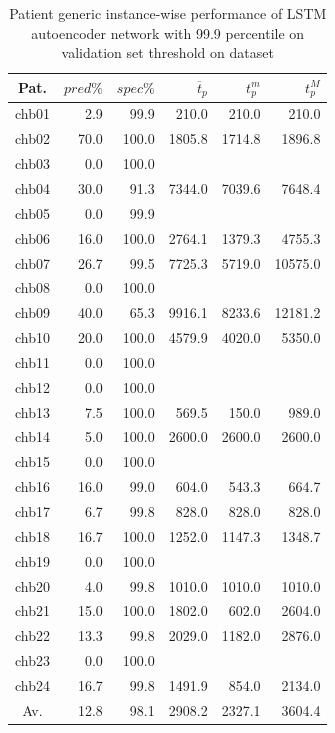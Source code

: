 \begin{table}[ht]
    \centering
    \begin{tabular}{c|rrrrr}
    Pat.  & $pred\%$ & $spec\%$ & $\overline{t}_p$   & $t_p^m$  & $t_p^M$   \\ \hline
    chb01   & 2.9    & 99.9   & 210.0   & 210.0   & 210.0   \\
    chb02   & 70.0   & 100.0  & 1805.8  & 1714.8  & 1896.8  \\
    chb03   & 0.0    & 100.0  &         &         &         \\
    chb04   & 30.0   & 91.3   & 7344.0  & 7039.6  & 7648.4  \\
    chb05   & 0.0    & 99.9   &         &         &         \\
    chb06   & 16.0   & 100.0  & 2764.1  & 1379.3  & 4755.3  \\
    chb07   & 26.7   & 99.5   & 7725.3  & 5719.0  & 10575.0 \\
    chb08   & 0.0    & 100.0  &         &         &         \\
    chb09   & 40.0   & 65.3   & 9916.1  & 8233.6  & 12181.2 \\
    chb10   & 20.0   & 100.0  & 4579.9  & 4020.0  & 5350.0  \\
    chb11   & 0.0    & 100.0  &         &         &         \\
    chb12   & 0.0    & 100.0  &         &         &         \\
    chb13   & 7.5    & 100.0  & 569.5   & 150.0   & 989.0   \\
    chb14   & 5.0    & 100.0  & 2600.0  & 2600.0  & 2600.0  \\
    chb15   & 0.0    & 100.0  &         &         &         \\
    chb16   & 16.0   & 99.0   & 604.0   & 543.3   & 664.7   \\
    chb17   & 6.7    & 99.8   & 828.0   & 828.0   & 828.0   \\
    chb18   & 16.7   & 100.0  & 1252.0  & 1147.3  & 1348.7  \\
    chb19   & 0.0    & 100.0  &         &         &         \\
    chb20   & 4.0    & 99.8   & 1010.0  & 1010.0  & 1010.0  \\
    chb21   & 15.0   & 100.0  & 1802.0  & 602.0   & 2604.0  \\
    chb22   & 13.3   & 99.8   & 2029.0  & 1182.0  & 2876.0  \\
    chb23   & 0.0    & 100.0  &         &         &         \\
    chb24   & 16.7   & 99.8   & 1491.9  & 854.0   & 2134.0  \\ \hline
    Av.     & 12.8   & 98.1   & 2908.2  & 2327.1  & 3604.4  \\ \hline
    \end{tabular}
    \caption{Patient generic instance-wise performance of LSTM autoencoder network with 99.9 percentile on validation set threshold on  dataset}
    \label{tab:patient-generic-99.9perc-lstm-instance} 
\end{table}

